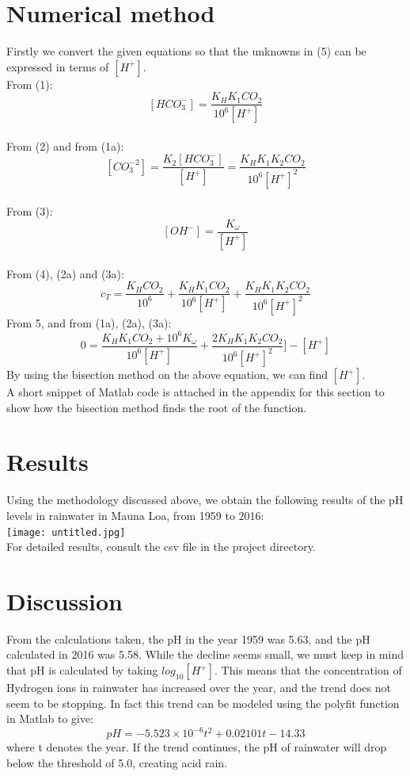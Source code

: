 \documentclass{book}
\begin{document}
	\section{Numerical method}
	Firstly we convert the given equations so that the unknowns in (5) can be expressed in terms of ${[H^+]}$. \\
	From (1):
	\[ [HCO_3^-] = \frac{K_HK_1CO_2}{10^6[H^+]} \tag{1a} \] \\
	From (2) and from (1a):
	\[ [CO_3^{-2}] = \frac{K_2[HCO_3^-]}{[H^+]} \tag{2a} = \frac{K_HK_1K_2CO_2}{10^6[H^+]^2} \] \\
	From (3):
	\[ [OH^-] = \frac{K_\omega}{[H^+]} \tag{3a} \] \\
	From (4), (2a) and (3a):
	\[ c_T = \frac{K_HCO_2}{10^6} + \frac{K_HK_1CO_2}{10^6[H^+]} + \frac{K_HK_1K_2CO_2}{10^6[H^+]^2} \tag{4a} \]
	From 5, and from (1a), (2a), (3a):
	\[ 0 =  \frac{K_HK_1CO_2 + 10^6K_\omega}{10^6[H^+]} + \frac{2K_HK_1K_2CO_2}{10^6[H^+]^2}] - [H^+] \tag{5a} \]
	By using the bisection method on the above equation, we can find ${[H^+]}$. \\
	A short snippet of Matlab code is attached in the appendix for this section to show how the bisection method finds the root of the function. 
	
	\section{Results}
	Using the methodology discussed above, we obtain the following results of the pH levels in rainwater in Mauna Loa, from 1959 to 2016:\\
	\texttt{[image: untitled.jpg]} \\
	For detailed results, consult the csv file in the project directory.
	
	\section{Discussion}
	From the calculations taken, the pH in the year 1959 was 5.63, and the pH calculated in 2016 was 5.58. While the decline seems small, we must keep in mind that pH is calculated by taking ${log_{10}}{[H^+]}$. This means that the concentration of Hydrogen ions in rainwater has increased over the year, and the trend does not seem to be stopping. In fact this trend can be modeled using the polyfit function in Matlab to give:
	\[pH = -5.523 \times 10^{-6}t^2 + 0.02101t - 14.33\] 
	where t denotes the year. If the trend continues, the pH of rainwater will drop below the threshold of 5.0, creating acid rain.
\end{document}

